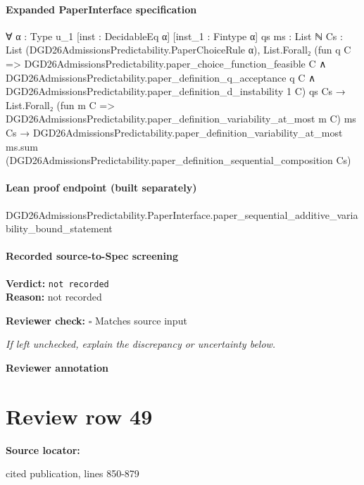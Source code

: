 \documentclass[10pt]{article}
\newcommand{\reviewerbox}{%
  \par\noindent\fbox{\parbox{0.96\linewidth}{\rule{0pt}{0.38in}}}\par
}
\newcommand{\reviewmatch}[1]{%
  \par\noindent\textbf{Reviewer check:} $\square$\; #1\par
  \noindent\emph{If left unchecked, explain the discrepancy or uncertainty below.}\par
}
\begin{document}
\paragraph{Expanded PaperInterface specification}
\begin{ReviewVerbatim}
∀ {α : Type u_1} [inst : DecidableEq α] [inst_1 : Fintype α] {qs ms : List ℕ}
  {Cs : List (DGD26AdmissionsPredictability.PaperChoiceRule α)},
  List.Forall₂
      (fun q C =>
        DGD26AdmissionsPredictability.paper_choice_function_feasible C ∧
          DGD26AdmissionsPredictability.paper_definition_q_acceptance q C ∧
            DGD26AdmissionsPredictability.paper_definition_d_instability 1 C)
      qs Cs →
    List.Forall₂ (fun m C => DGD26AdmissionsPredictability.paper_definition_variability_at_most m C) ms Cs →
      DGD26AdmissionsPredictability.paper_definition_variability_at_most ms.sum
        (DGD26AdmissionsPredictability.paper_definition_sequential_composition Cs)
\end{ReviewVerbatim}

\paragraph{Lean proof endpoint (built separately)}\begin{ReviewVerbatim}
DGD26AdmissionsPredictability.PaperInterface.paper_sequential_additive_variability_bound_statement
\end{ReviewVerbatim}

\paragraph{Recorded source-to-Spec screening}
\textbf{Verdict:} \texttt{not recorded}
\\
\textbf{Reason:} not recorded
\reviewmatch{Matches source input}
\noindent\textbf{Reviewer annotation}\par
\reviewerbox
\clearpage
\hypertarget{source-claim-fff538b4a617e0f3}{}
\section*{Review row 49}
\textbf{Source locator:} {\footnotesize\raggedright cited publication, lines 850-\allowbreak{}879\par}
\end{document}
